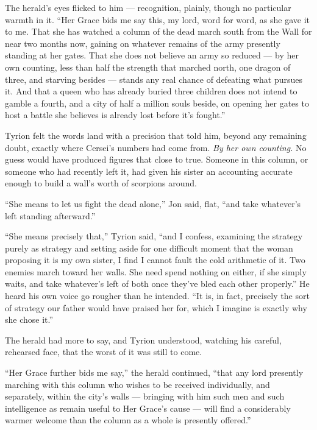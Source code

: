 The herald’s eyes flicked to him — recognition, plainly, though no particular warmth in it. “Her Grace bids me say this, my lord, word for word, as she gave it to me. That she has watched a column of the dead march south from the Wall for near two months now, gaining on whatever remains of the army presently standing at her gates. That she does not believe an army so reduced — by her own counting, less than half the strength that marched north, one dragon of three, and starving besides — stands any real chance of defeating what pursues it. And that a queen who has already buried three children does not intend to gamble a fourth, and a city of half a million souls beside, on opening her gates to host a battle she believes is already lost before it’s fought.”

Tyrion felt the words land with a precision that told him, beyond any remaining doubt, exactly where Cersei’s numbers had come from. \textit{By her own counting.} No guess would have produced figures that close to true. Someone in this column, or someone who had recently left it, had given his sister an accounting accurate enough to build a wall’s worth of scorpions around.

“She means to let us fight the dead alone,” Jon said, flat, “and take whatever’s left standing afterward.”

“She means precisely that,” Tyrion said, “and I confess, examining the strategy purely as strategy and setting aside for one difficult moment that the woman proposing it is my own sister, I find I cannot fault the cold arithmetic of it. Two enemies march toward her walls. She need spend nothing on either, if she simply waits, and take whatever’s left of both once they’ve bled each other properly.” He heard his own voice go rougher than he intended. “It is, in fact, precisely the sort of strategy our father would have praised her for, which I imagine is exactly why she chose it.”

\sceneBreak

The herald had more to say, and Tyrion understood, watching his careful, rehearsed face, that the worst of it was still to come.

“Her Grace further bids me say,” the herald continued, “that any lord presently marching with this column who wishes to be received individually, and separately, within the city’s walls — bringing with him such men and such intelligence as remain useful to Her Grace’s cause — will find a considerably warmer welcome than the column as a whole is presently offered.”


